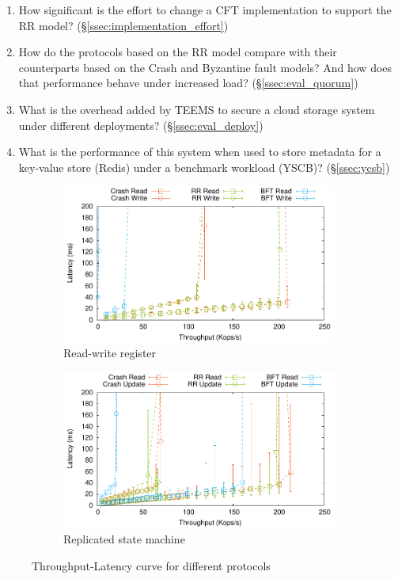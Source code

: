 \begin{enumerate}
    \item How significant is the effort to change a \ac{CFT}
        implementation to support the \ac{RR} model?
        (\S\ref{ssec:implementation_effort})
    \item How do the protocols based on the \ac{RR} model
      compare with their counterparts based on the Crash and Byzantine
      fault models? And how does that performance behave under increased load?  (\S\ref{ssec:eval_quorum})
    \item What is the overhead added by \ac{TEEMS} to secure a cloud storage system under different
      deployments?  (\S\ref{ssec:eval_deploy})
    \item What is the performance of this system  when used to store
      metadata for a key-value store (Redis) under a benchmark
      workload (YSCB)?
      (\S\ref{ssec:ycsb})
\end{enumerate}
\begin{figure}[th!]
    \centering
    \begin{subfigure}[t]{0.45 * 10cm}
        \includegraphics[width=\linewidth]{teem_results/protocol/1ms/reg-tput/result/reg}
        \caption{Read-write register}\label{fig:reg_tputlat}
    \end{subfigure}
    \begin{subfigure}[t]{0.45 * 10cm}
        \includegraphics[width=\linewidth]{teem_results/protocol/1ms/smr-tput/result/smr}
        \caption{Replicated state machine}\label{fig:smr_tputlat}
    \end{subfigure}
    \caption{Throughput-Latency curve for different protocols}
\end{figure}

